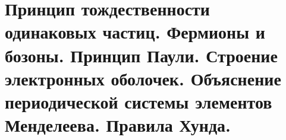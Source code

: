 \chapter{Принцип тождественности одинаковых частиц. Фермионы и бозоны. 
Принцип Паули. Строение электронных оболочек. Объяснение периодической 
системы элементов Менделеева. Правила Хунда.}

\newpage

